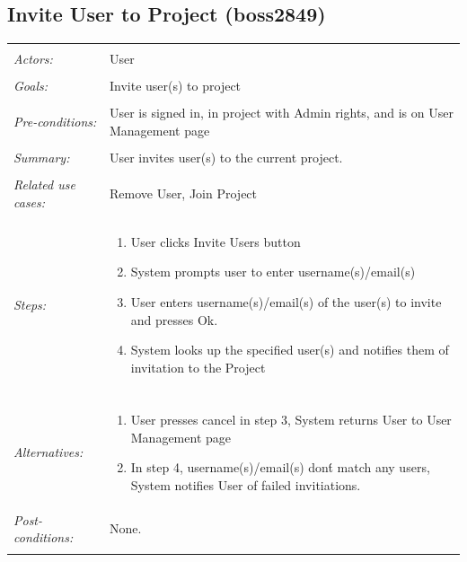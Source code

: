 \documentclass[11pt]{report}
\begin{document}
\subsection{Invite User to Project  (boss2849)}
\begin{tabular}{ p{2cm} p{12cm} }
 \hline
 \\
 \textit{Actors:} & User \\ 
 \\
 \textit{Goals:} & Invite user(s) to project \\
 \\
 \textit{Pre-conditions:} & User is signed in, in project with Admin rights, and is on User Management page \\
 \\
 \textit{Summary:} & User invites user(s) to the current project. \\ 
 \\
 \textit{Related use cases:} & Remove User, Join Project \\ 
 \\
 \textit{Steps:} & \begin{enumerate}
  \item User clicks Invite Users button
  \item System prompts user to enter username(s)/email(s)
  \item User enters username(s)/email(s) of the user(s) to invite and presses Ok.
  \item System looks up the specified user(s) and notifies them of invitation to the Project
 \end{enumerate} \\
 \\
 \textit{Alternatives:} & \begin{enumerate}
  \item User presses cancel in step 3, System returns User to User Management page
  \item In step 4, username(s)/email(s) don\'t match any users, System notifies User of failed invitiations.
 \end{enumerate} 
 \\
 \textit{Post-conditions:} & None. \\
 \\
\hline
\end{tabular}
\end{document}
